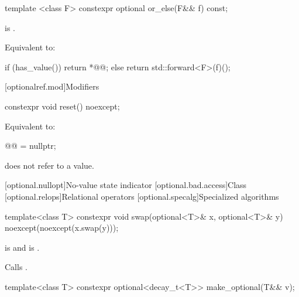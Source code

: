\begin{addedblock}
\begin{itemdecl}
template <class F>
constexpr optional or_else(F&& f) const;
\end{itemdecl}

\begin{itemdescr}
  \pnum
  \mandates
   is .

  \pnum
  \effects
  Equivalent to:
  \begin{codeblock}
    if (has_value()) {
        return *@@;
    } else {
        return std::forward<F>(f)();
    }
  \end{codeblock}
\end{itemdescr}


[optionalref.mod]{Modifiers}

\begin{itemdecl}
constexpr void reset() noexcept;
\end{itemdecl}

\begin{itemdescr}
  \pnum
  \effects
  Equivalent to:
  \begin{codeblock}
  @@ = nullptr;
  \end{codeblock}
   does not refer to a value.
\end{itemdescr}

\end{addedblock}

[optional.nullopt]{No-value state indicator}
[optional.bad.access]{Class }
[optional.relops]{Relational operators}
[optional.specalg]{Specialized algorithms}
%
\begin{itemdecl}
template<class T>
  constexpr void swap(optional<T>& x, optional<T>& y) noexcept(noexcept(x.swap(y)));
\end{itemdecl}

\begin{itemdescr}
\pnum
\constraints
{} is  and
 is .

\pnum
\effects
Calls .
\end{itemdescr}


%
\begin{itemdecl}
template<class T> constexpr optional<decay_t<T>> make_optional(T&& v);
\end{itemdecl}

